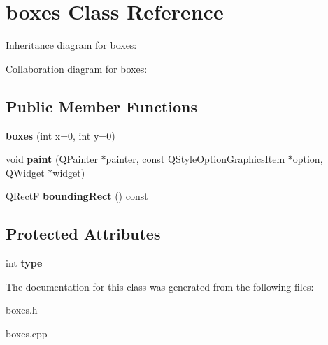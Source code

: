 \hypertarget{classboxes}{\section{boxes Class Reference}
\label{classboxes}
}


Inheritance diagram for boxes\-:


Collaboration diagram for boxes\-:
\subsection*{Public Member Functions}
\begin{DoxyCompactItemize}
\item 
\hypertarget{classboxes_a093427b27f4b84a803544cb738dc12e6}{{\bfseries boxes} (int x=0, int y=0)}\label{classboxes_a093427b27f4b84a803544cb738dc12e6}

\item 
\hypertarget{classboxes_aa07b0460f8be5da676c4369331061fa6}{void {\bfseries paint} (Q\-Painter $\ast$painter, const Q\-Style\-Option\-Graphics\-Item $\ast$option, Q\-Widget $\ast$widget)}\label{classboxes_aa07b0460f8be5da676c4369331061fa6}

\item 
\hypertarget{classboxes_a4855400f92db9ebe776a79c79bac1d50}{Q\-Rect\-F {\bfseries bounding\-Rect} () const }\label{classboxes_a4855400f92db9ebe776a79c79bac1d50}

\end{DoxyCompactItemize}
\subsection*{Protected Attributes}
\begin{DoxyCompactItemize}
\item 
\hypertarget{classboxes_a2600eb866b188f33fb6415fc358f449a}{int {\bfseries type}}\label{classboxes_a2600eb866b188f33fb6415fc358f449a}

\end{DoxyCompactItemize}


The documentation for this class was generated from the following files\-:\begin{DoxyCompactItemize}
\item 
boxes.\-h\item 
boxes.\-cpp\end{DoxyCompactItemize}
